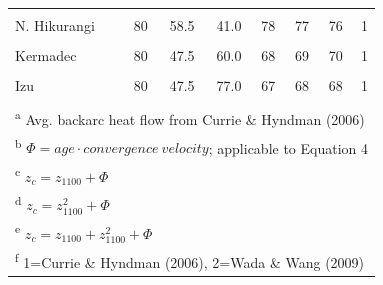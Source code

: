\documentclass[draft,linenumbers]{agujournal2018}
\begin{document}
\begin{table}
\begin{tabular}[t]{lrrrrrrr}
\addlinespace
\cellcolor{gray!6}{Aleutians} & \cellcolor{gray!6}{75} & \cellcolor{gray!6}{51.6} & \cellcolor{gray!6}{39.6} & \cellcolor{gray!6}{73} & \cellcolor{gray!6}{73} & \cellcolor{gray!6}{73} & \cellcolor{gray!6}{1}\\
N. Hikurangi & 80 & 58.5 & 41.0 & 78 & 77 & 76 & 1\\
\cellcolor{gray!6}{Mariana} & \cellcolor{gray!6}{80} & \cellcolor{gray!6}{47.5} & \cellcolor{gray!6}{54.6} & \cellcolor{gray!6}{69} & \cellcolor{gray!6}{70} & \cellcolor{gray!6}{70} & \cellcolor{gray!6}{1}\\
Kermadec & 80 & 47.5 & 60.0 & 68 & 69 & 70 & 1\\
\cellcolor{gray!6}{Kamchatka} & \cellcolor{gray!6}{70} & \cellcolor{gray!6}{80.2} & \cellcolor{gray!6}{77.0} & \cellcolor{gray!6}{89} & \cellcolor{gray!6}{88} & \cellcolor{gray!6}{88} & \cellcolor{gray!6}{1}\\
\addlinespace
Izu & 80 & 47.5 & 77.0 & 67 & 68 & 68 & 1\\
\cellcolor{gray!6}{NE Japan} & \cellcolor{gray!6}{88} & \cellcolor{gray!6}{47.7} & \cellcolor{gray!6}{107.9} & \cellcolor{gray!6}{64} & \cellcolor{gray!6}{65} & \cellcolor{gray!6}{65} & \cellcolor{gray!6}{1}\\
\bottomrule
\multicolumn{8}{l}{\rule{0pt}{1em}\textsuperscript{a} Avg. backarc heat flow from Currie \& Hyndman (2006)}\\
\multicolumn{8}{l}{\rule{0pt}{1em}\textsuperscript{b} $\Phi=age \cdot convergence~velocity$; applicable to Equation 4}\\
\multicolumn{8}{l}{\rule{0pt}{1em}\textsuperscript{c} $z_c=z_{1100}+\Phi$}\\
\multicolumn{8}{l}{\rule{0pt}{1em}\textsuperscript{d} $z_c=z_{1100}^2+\Phi$}\\
\multicolumn{8}{l}{\rule{0pt}{1em}\textsuperscript{e} $z_c=z_{1100}+z_{1100}^2+\Phi$}\\
\multicolumn{8}{l}{\rule{0pt}{1em}\textsuperscript{f} 1=Currie \& Hyndman (2006), 2=Wada \& Wang (2009)}\\
\end{tabular}
\end{table}
\end{document}
